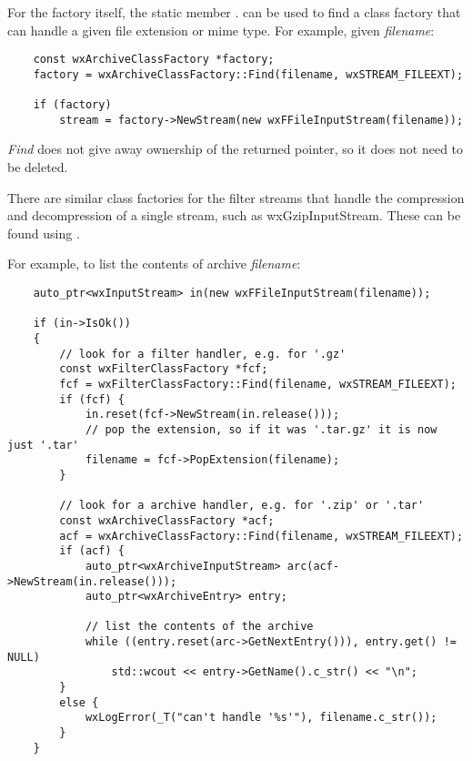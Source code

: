 For the factory itself, the static member
 .
can be used to find a class factory that can handle a given file
extension or mime type. For example, given {\it filename}:

\begin{verbatim}
    const wxArchiveClassFactory *factory;
    factory = wxArchiveClassFactory::Find(filename, wxSTREAM_FILEEXT);

    if (factory)
        stream = factory->NewStream(new wxFFileInputStream(filename));

\end{verbatim}

{\it Find} does not give away ownership of the returned pointer, so it
does not need to be deleted.

There are similar class factories for the filter streams that handle the
compression and decompression of a single stream, such as wxGzipInputStream.
These can be found using
 .

For example, to list the contents of archive {\it filename}:

\begin{verbatim}
    auto_ptr<wxInputStream> in(new wxFFileInputStream(filename));

    if (in->IsOk())
    {
        // look for a filter handler, e.g. for '.gz'
        const wxFilterClassFactory *fcf;
        fcf = wxFilterClassFactory::Find(filename, wxSTREAM_FILEEXT);
        if (fcf) {
            in.reset(fcf->NewStream(in.release()));
            // pop the extension, so if it was '.tar.gz' it is now just '.tar'
            filename = fcf->PopExtension(filename);
        }

        // look for a archive handler, e.g. for '.zip' or '.tar'
        const wxArchiveClassFactory *acf;
        acf = wxArchiveClassFactory::Find(filename, wxSTREAM_FILEEXT);
        if (acf) {
            auto_ptr<wxArchiveInputStream> arc(acf->NewStream(in.release()));
            auto_ptr<wxArchiveEntry> entry;

            // list the contents of the archive
            while ((entry.reset(arc->GetNextEntry())), entry.get() != NULL)
                std::wcout << entry->GetName().c_str() << "\n";
        }
        else {
            wxLogError(_T("can't handle '%s'"), filename.c_str());
        }
    }

\end{verbatim}


